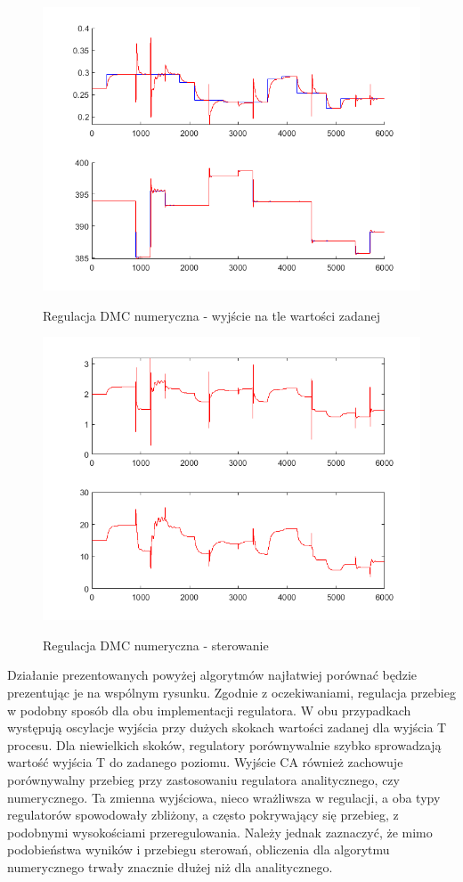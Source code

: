 \begin{figure}[h!]
	\centering
	\includegraphics[width=.7\linewidth]{img/yDMCnum.png}
	\label{ch2:dmcnum}
	\caption{Regulacja DMC numeryczna - wyjście na tle wartości zadanej}
\end{figure}
\begin{figure}[h!]
	\centering
	\includegraphics[width=.7\linewidth]{img/uDMCnum.png}
	\label{ch2:dmcnumster}
	\caption{Regulacja DMC numeryczna - sterowanie}
\end{figure}
\newpage
Działanie prezentowanych powyżej algorytmów najłatwiej porównać będzie prezentując je na wspólnym rysunku. 
Zgodnie z oczekiwaniami, regulacja przebieg w podobny sposób dla obu implementacji regulatora. W obu przypadkach występują oscylacje wyjścia przy dużych skokach wartości zadanej dla wyjścia T procesu. Dla niewielkich skoków, regulatory porównywalnie szybko sprowadzają wartość wyjścia T do zadanego poziomu. Wyjście CA również zachowuje porównywalny przebieg przy zastosowaniu regulatora analitycznego, czy numerycznego. Ta zmienna wyjściowa, nieco wrażliwsza w regulacji, a oba typy regulatorów spowodowały zbliżony, a często pokrywający się przebieg, z podobnymi wysokościami przeregulowania.
Należy jednak zaznaczyć, że mimo podobieństwa wyników i przebiegu sterowań, obliczenia dla algorytmu numerycznego trwały znacznie dłużej niż dla analitycznego.
